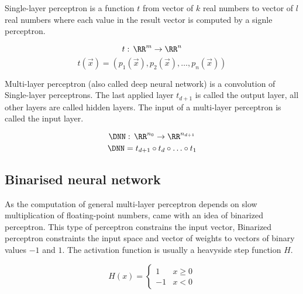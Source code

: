 \begin{definition}
Single-layer perceptron is a function $t$ from vector of $k$ real numbers
to vector of $l$ real numbers where each value in the result vector is computed
by a signle perceptron.

\begin{equation*}
    t: \, \RR^{m} \to \RR^{n}
\end{equation*}
\begin{equation*}
    t(\vec x) = (p_{1}(\vec x), p_{2}(\vec x), \ldots, p_{n}(\vec x))
\end{equation*}
\end{definition}

\begin{definition}
Multi-layer perceptron (also called deep neural network)
is a convolution of Single-layer perceptrons.
The last applied layer $t_{d+1}$ is called the output layer,
all other layers are called hidden
layers. The input of a multi-layer perceptron is called the input layer.

\begin{equation*}
    \DNN: \, \RR^{n_0} \to \RR^{n_{d+1}}
\end{equation*}
\begin{equation*}
    \DNN = t_{d+1} \circ t_d \circ \ldots \circ t_1
\end{equation*}
\end{definition}

\sectionsep{}

\subsection{Binarised neural network}

As the computation of general multi-layer perceptron depends on slow multiplication of
floating-point numbers, %
came with an idea of binarized perceptron. This type of perceptron constrains
the input vector, 
Binarized perceptron constraints the input space and vector of weights
to vectors of binary values $-1$ and $1$. The activation function is usually
a heavyside step function $H$.

\begin{equation*}
	H(x) = \left\{\begin{array}{ll}
			1 & x \geq 0\\
			-1 & x < 0
		\end{array}\right.
\end{equation*}


